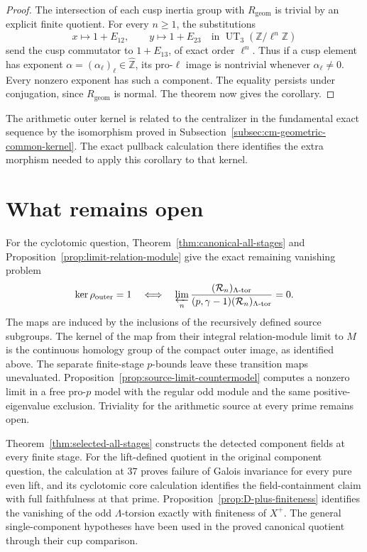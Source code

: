 \documentclass[11pt]{article}
\theoremstyle{definition}\newtheorem{definition}[theorem]{Definition}
\begin{document}
\begin{proof}
The intersection of each cusp inertia group with
\(R_{\mathrm{geom}}\) is trivial by an explicit finite quotient.
For every \(n\geq1\), the substitutions
\[
 x\longmapsto1+E_{12},\qquad y\longmapsto1+E_{23}
       \quad\text{in }\operatorname{UT}_3(\mathbb Z/\ell^n\mathbb Z)
\]
send the cusp commutator to \(1+E_{13}\), of exact order
\(\ell^n\).
Thus if a cusp element has exponent
\(\alpha=(\alpha_\ell)_\ell\in\widehat{\mathbb Z}\),
its pro-\(\ell\) image is nontrivial whenever
\(\alpha_\ell\neq0\).
Every nonzero exponent has such a component.
The equality persists under conjugation, since
\(R_{\mathrm{geom}}\) is normal.
The theorem now gives the corollary.
\end{proof}

The arithmetic outer kernel is related to the centralizer in the
fundamental exact sequence by the isomorphism proved in
Subsection~\ref{subsec:cm-geometric-common-kernel}.
The exact pullback calculation there identifies the extra
morphism needed to apply this corollary to that kernel.


\section{What remains open}

For the cyclotomic question, Theorem~\ref{thm:canonical-all-stages} and Proposition~\ref{prop:limit-relation-module} give the exact remaining vanishing problem
\[
 \ker\rho_{\mathrm{outer}}=1
 \quad\Longleftrightarrow\quad
 \varprojlim_n
 \frac{(\mathcal R_n)_{\Lambda\text{-tor}}}
      {(p,\gamma-1)(\mathcal R_n)_{\Lambda\text{-tor}}}=0.
\]
The maps are induced by the inclusions of the recursively defined source subgroups. The kernel of the map from their integral relation-module limit to $M$ is the continuous homology group of the compact outer image, as identified above. The separate finite-stage $p$-bounds leave these transition maps unevaluated. Proposition~\ref{prop:source-limit-countermodel} computes a nonzero limit in a free pro-$p$ model with the regular odd module and the same positive-eigenvalue exclusion. Triviality for the arithmetic source at every prime remains open.

Theorem~\ref{thm:selected-all-stages} constructs the detected component fields at every finite stage. For the lift-defined quotient in the original component question, the calculation at $37$ proves failure of Galois invariance for every pure even lift, and its cyclotomic core calculation identifies the field-containment claim with full faithfulness at that prime. Proposition~\ref{prop:D-plus-finiteness} identifies the vanishing of the odd $\Lambda$-torsion exactly with finiteness of $X^+$. The general single-component hypotheses have been used in the proved canonical quotient through their cup comparison.
\end{document}
